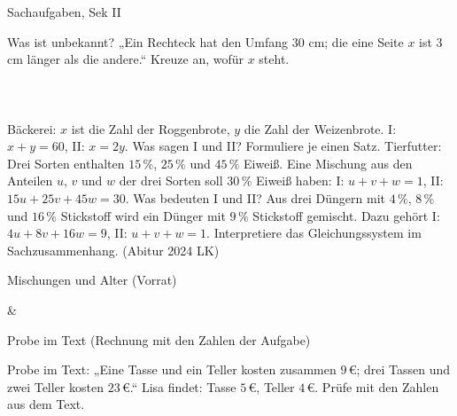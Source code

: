 \begin{aufgabe}{Sachaufgaben, Sek II}
\begin{teile}
\teil Was ist unbekannt? „Ein Rechteck hat den Umfang $30$ cm; die eine Seite $x$ ist $3$ cm länger als die andere.“ Kreuze an, wofür $x$ steht.\\ \\ \\ \\ 
\teil Bäckerei: $x$ ist die Zahl der Roggenbrote, $y$ die Zahl der Weizenbrote. I: $x + y = 60$, II: $x = 2y$. Was sagen I und II? Formuliere je einen Satz.
\teil Tierfutter: Drei Sorten enthalten $15\,\%$, $25\,\%$ und $45\,\%$ Eiweiß. Eine Mischung aus den Anteilen $u$, $v$ und $w$ der drei Sorten soll $30\,\%$ Eiweiß haben: I: $u + v + w = 1$, II: $15u + 25v + 45w = 30$. Was bedeuten I und II?
\teil Aus drei Düngern mit $4\,\%$, $8\,\%$ und $16\,\%$ Stickstoff wird ein Dünger mit $9\,\%$ Stickstoff gemischt. Dazu gehört I: $4u + 8v + 16w = 9$, II: $u + v + w = 1$. Interpretiere das Gleichungssystem im Sachzusammenhang. \hfill (Abitur 2024 LK)
\end{teile}
\end{aufgabe}

\begin{aufgabe}{Mischungen und Alter (Vorrat)}
\begin{gleichungsraster}[2]
 & \\
\end{gleichungsraster}
\end{aufgabe}

\begin{aufgabe}{Probe im Text (Rechnung mit den Zahlen der Aufgabe)}
\begin{teile}
\teil Probe im Text: „Eine Tasse und ein Teller kosten zusammen $9\,€$; drei Tassen und zwei Teller kosten $23\,€$.“ Lisa findet: Tasse $5\,€$, Teller $4\,€$. Prüfe mit den Zahlen aus dem Text. \janein
\end{teile}
\end{aufgabe}

